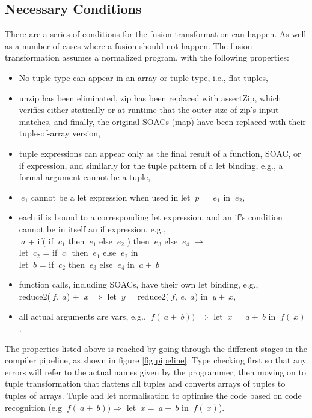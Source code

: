 \documentclass[11pt]{article}
\begin{document}
\subsection{Necessary Conditions}
There are a series of conditions for the fusion transformation can happen. As well as a number of cases where a fusion should not happen. The fusion transformation assumes a normalized program, with the following properties: \cite[Figure 5, page 4]{T2Fusion} 

\begin{itemize}
\item No tuple type can appear in an array or tuple type, i.e., flat
tuples,
\item unzip has been eliminated, zip has been replaced with assertZip,
which verifies either statically or at runtime that the outer size of zip’s input matches, and finally, the original SOACs (map)
have been replaced with their tuple-of-array version,
\item tuple expressions can appear only as the final result of a function,
SOAC, or if expression, and similarly for the tuple pattern
of a let binding, e.g., a formal argument cannot be a tuple,
\item $\: e_1$ cannot be a let expression when used in let $\: p$ = $\: e_1$ in $\: e_2$,
\item each if is bound to a corresponding let expression, and
an if’s condition cannot be in itself an if expression, e.g., \\
$\: a$ + if( if $\: c_1$ then $\: e_1$ else $\: e_2$ ) then $\: e_3$ else $\: e_4$ $\rightarrow$ \\
let $\: c_2$ = if $\: c_1$ then $\: e_1$ else $\: e_2$ in \\
let $\: b$ = if $\: c_2$ then $\: e_3$ else $\: e_4$ in $\: a+ \:b$ 
\item function calls, including SOACs, have their own let binding, e.g., \\
reduce2($\:f,\:a$) + $\:x$ $\Rightarrow$ let $\:y$ = reduce2($\:f,\:e,\:a$) in $\:y+\:x$,
\item all actual arguments are vars, e.g., $\:f(\:a+\:b))$ $\Rightarrow$ let $\:x=\:a+\:b$ in $\:f(\:x)$.
\end{itemize}
The properties listed above is reached by going through the different stages in the compiler pipeline, as shown in figure \ref{fig:pipeline}. Type checking first so that any errors will refer to the actual names given by the programmer, then moving on to tuple transformation that flattens all tuples and converts arrays of tuples to tuples of arrays. Tuple and let normalisation to optimise the code based on code recognition (e.g $\:f(\:a+\:b)) \Rightarrow$ let $\:x=\:a+\:b$ in $\:f(\:x)$).
\end{document}
